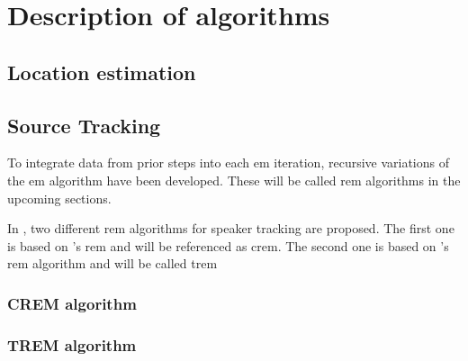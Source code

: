 \chapter{Description of algorithms}
\label{chap:algorithms}


\section{Location estimation}
\label{sec:algLocEst}

\section{Source Tracking}
\label{sec:algSrcTrack}
To integrate data from prior steps into each \gls{em} iteration, recursive variations of the \gls{em} algorithm have been developed. These will be called \gls{rem} algorithms in the upcoming sections.

In \cite{Schwartz2014}, two different \gls{rem} algorithms for speaker tracking are proposed. The first one is based on \citeauthor{Cappe2009}'s \gls{rem} and will be referenced as \gls{crem}. The second one is based on \citeauthor{Titterington1984}'s \gls{rem} algorithm and will be called \gls{trem}

\subsection{CREM algorithm}
\subsection{TREM algorithm}